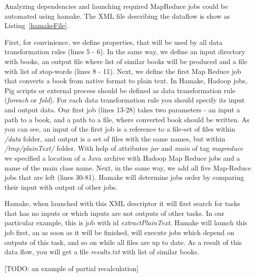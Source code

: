 \documentclass[10pt,conference,letterpaper]{IEEEtran}
\begin{document}
Analyzing dependencies and launching required MapReduce jobs could be
automated using hamake. The XML file describing the dataflow is show
as Listing~\ref{hamakeFile}.

First, for convinience, we define properties, that will be used by all
data transformation rules (lines 5 - 6). In the same way, we define an
input directory with books, an output file where list of similar books
will be produced and a file with list of stop-words (lines 8 - 11).
Next, we define the first Map Reduce job that converts a book from
native format to plain text. In Hamake, Hadoop jobs, Pig scripts or
external process should be defined as data transformation rule
(\textit{foreach} or \textit{fold}). For each data transformation rule
you should specify its input and output data. Our first job (lines
13-28) takes two parameters - an input a path to a book, and a path to
a file, where converted book should be written.  As you can see, an
input of the first job is a reference to a file-set of files within
\textit{/data} folder, and output is a set of files with the same
names, but within \textit{/tmp/plainText/} folder. With help of
attributes \textit{jar} and \textit{main} of tag \textit{mapreduce} we
specified a location of a Java archive with Hadoop Map Reduce jobs and
a name of the main class name. Next, in the same way, we add all five
Map-Reduce jobs that are left (lines 30-81). Hamake will determine
jobs order by comparing their input with output of other jobs.



Hamake, when launched with this XML descriptor it will first search
for tasks that has no inputs or which inputs are not outputs of other
tasks. In our particular example, this is job with id
\textit{extractPlainText}. Hamake will launch this job first, an as
soon as it will be finished, will execute jobs which depend on outputs
of this task, and so on while all files are up to date. As a result of
this data flow, you will get a file \textit{results.txt} with list of
similar books.

[TODO: an example of partial recalculation]
\end{document}
